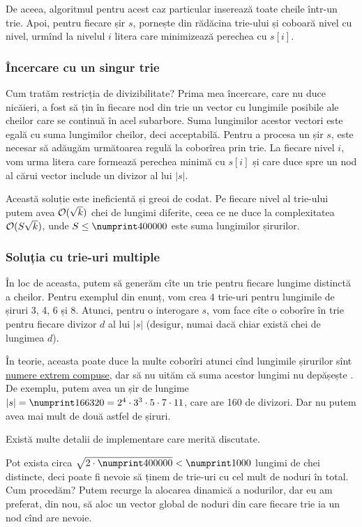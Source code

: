 \documentclass[../main.tex]{subfiles}
\begin{document}
De aceea, algoritmul pentru acest caz particular inserează toate cheile într-un trie. Apoi, pentru fiecare șir $s$, pornește din rădăcina trie-ului și coboară nivel cu nivel, urmînd la nivelul $i$ litera care minimizează perechea cu $s[i]$.

\subsubsection*{Încercare cu un singur trie}

Cum tratăm restricția de divizibilitate? Prima mea încercare, care nu duce nicăieri, a fost să țin în fiecare nod din trie un vector cu lungimile posibile ale cheilor care se continuă în acel subarbore. Suma lungimilor acestor vectori este egală cu suma lungimilor cheilor, deci acceptabilă. Pentru a procesa un șir $s$, este necesar să adăugăm următoarea regulă la coborîrea prin trie. La fiecare nivel $i$, vom urma litera care formează perechea minimă cu $s[i]$ și care duce spre un nod al cărui vector include un divizor al lui $|s|$.

Această soluție este ineficientă și greoi de codat. Pe fiecare nivel al trie-ului putem avea $\mathcal{O}(\sqrt{k})$ chei de lungimi diferite, ceea ce ne duce la complexitatea $\mathcal{O}(S \sqrt{k})$, unde $S \leq \np{400000}$ este suma lungimilor șirurilor.

\subsubsection*{Soluția cu trie-uri multiple}

În loc de aceasta, putem să generăm cîte un trie pentru fiecare lungime distinctă a cheilor. Pentru exemplul din enunț, vom crea 4 trie-uri pentru lungimile de șiruri 3, 4, 6 și 8. Atunci, pentru o interogare $s$, vom face cîte o coborîre în trie pentru fiecare divizor $d$ al lui $|s|$ (desigur, numai dacă chiar există chei de lungimea $d$).

În teorie, aceasta poate duce la multe coborîri atunci cînd lungimile șirurilor sînt \href{https://en.wikipedia.org/wiki/Highly_composite_number}{numere extrem compuse}, dar să nu uităm că suma acestor lungimi nu depășește . De exemplu, putem avea un șir de lungime $|s| = \np{166320} = 2^4 \cdot 3^3 \cdot 5 \cdot 7 \cdot 11$, care are 160 de divizori. Dar nu putem avea mai mult de două astfel de șiruri.

Există multe detalii de implementare care merită discutate.

Pot exista circa $\sqrt{2 \cdot \np{400000}} < \np{1000}$ lungimi de chei distincte, deci poate fi nevoie să ținem  de trie-uri cu cel mult  de noduri în total. Cum procedăm? Putem recurge la alocarea dinamică a nodurilor, dar eu am preferat, din nou, să aloc un vector global de noduri din care fiecare trie ia un nod cînd are nevoie.
\end{document}
